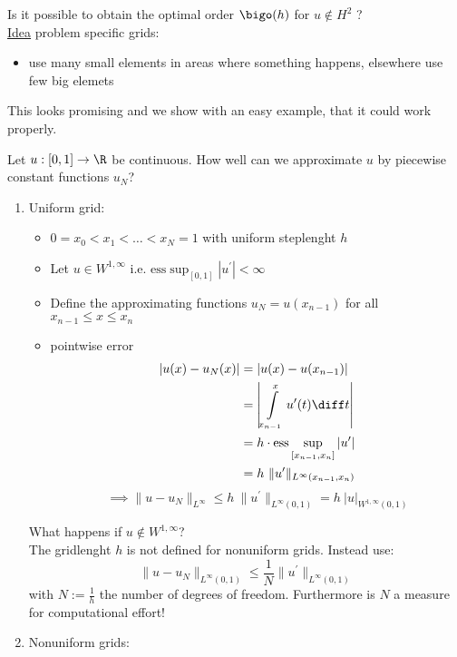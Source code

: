 Is it possible to obtain the optimal order $\bigo(h)$ for $u \not \in H^2$ ?\\
\underline{Idea} problem specific grids:
\begin{itemize}
	\item use many small elements in areas where something \glqq happens\grqq, elsewhere use few big elemets
\end{itemize} 
This looks promising and we show with an easy example, that it could work properly.
\begin{example}
	Let $u: [0,1] \to \R $ be continuous. How well can we approximate $u$ by piecewise constant functions $u_{N}$?
	\begin{enumerate}[label = \Roman*)]
		\item Uniform grid:
			\begin{itemize}
				\item $0 = x_{0} < x_{1}< \dots < x_{N} = 1$ with uniform steplenght $h$
				\item Let $u \in W^{1,\infty}$ i.e. $\text{ess}\sup_{[0,1]} | u^\prime|< \infty$ 
				\item Define the approximating functions $u_{N}=u(x_{n-1})$ for all $x_{n-1}\leq x \leq x_{n}$ 
				\item pointwise error
					\begin{align*}
						|u(x) - u_{N}(x) | &= | u(x) - u(x_{n-1})|\\
										   &= \left| \int\limits_{x_{n-1}}^{x} u^\prime(t) \diff t \right|\\
										   &= h\cdot \text{ess}\sup_{[x_{n-1},x_{n}]}|u^\prime | \\
										   &= h\ \|u^\prime\|_{L^\infty(x_{n-1},x_{n})}
					\end{align*} 
					\begin{equation*}
						\implies\|u -u_{N}\|_{L^\infty} \leq h \ \|u^\prime\|_{L^\infty(0,1)}= h \ |u|_{W^{1,\infty}(0,1)}
				\end{equation*} 
			\end{itemize} 
			What happens if $u \not \in W^{1,\infty}$?\\
			The gridlenght $h$ is not defined for nonuniform grids. Instead use:
			\begin{equation*}
				\|u-u_{N}\|_{L^{\infty}(0,1)}  \leq \frac{1}{N} \|u^\prime\|_{L^\infty(0,1)}
			\end{equation*} 
			with $N := \frac{1}{h}$ the number of degrees of freedom. Furthermore is $N$ a measure for computational effort!
		\item Nonuniform grids:\\

\end{enumerate}
\end{example}
